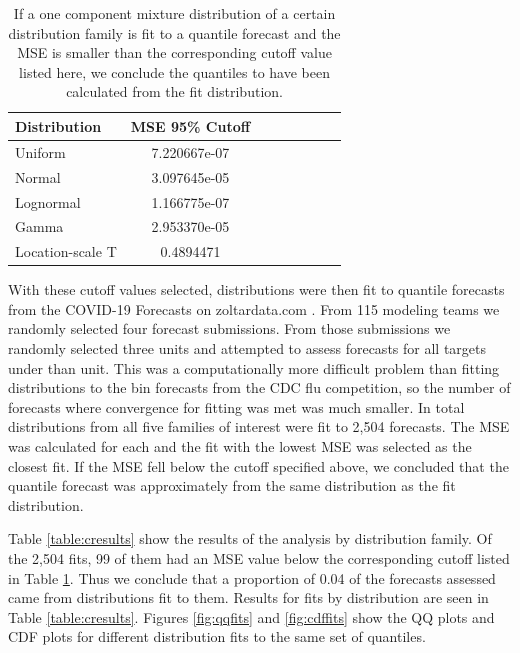 \documentclass[11pt,notitlepage]{isuthesis}
\begin{document}
\begin{table}[h!]
  \centering
  \begin{tabular}{l*{6}{c}r}
  Distribution          & MSE 95\% Cutoff \\
  \hline
  Uniform               & 7.220667e-07   \\
  Normal                & 3.097645e-05  \\
  Lognormal             & 1.166775e-07  \\
  Gamma                 & 2.953370e-05  \\
  Location-scale T      & 0.4894471 \\
  \end{tabular}
  \begin{center}
\begin{minipage}{10cm}
\captionsetup{font=scriptsize}
  \caption[Quantile cutoff values]{If a one component mixture distribution of a
  certain distribution family
  is fit to a quantile forecast and the MSE is smaller than
  the corresponding cutoff value listed here, we conclude the quantiles to 
  have been calculated from the fit distribution.}
  \label{table:quantcutoffs}
  \end{minipage}
  \end{center}
\end{table}


With these cutoff values selected, distributions were then fit to quantile 
forecasts
from the COVID-19 Forecasts on zoltardata.com \cite[]{zoltarcovid}.
From 115 modeling teams we randomly selected four forecast submissions. From 
those submissions we randomly selected three units and attempted to assess
forecasts for all targets under than unit.
This was a computationally more
difficult problem than fitting distributions to the bin forecasts from the CDC
flu competition, so the number of forecasts where convergence for fitting was
met was much smaller. In total distributions from all five families of interest
were fit to 2,504 forecasts. 
The MSE was calculated for each and the fit with the
lowest MSE was selected as the closest fit. If the MSE fell below the cutoff
specified above, we concluded that the quantile forecast was approximately
from the same distribution as the fit distribution. 

Table \ref{table:cresults} show the results of the analysis by distribution
family.
Of the 2,504 fits, 99 of 
them had an MSE value below the corresponding cutoff listed in Table
\ref{table:quantcutoffs}. Thus we conclude that a proportion of 0.04 of the 
forecasts assessed came from distributions fit to them.
Results for fits by
distribution are seen in Table \ref{table:cresults}.
Figures \ref{fig:qqfits} and \ref{fig:cdffits} show the QQ plots and CDF plots
for different distribution fits to the same set of quantiles.
\end{document}
